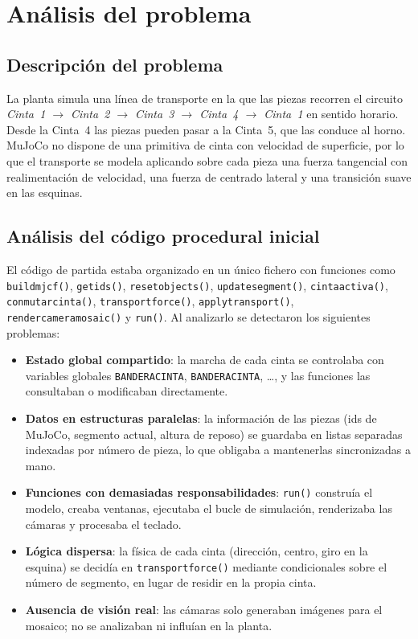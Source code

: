 \documentclass[12pt,a4paper]{article}
\renewcommand{\_}{\guionbajo\allowbreak}
\begin{document}
\clearpage
\section{Análisis del problema}

\subsection{Descripción del problema}

La planta simula una línea de transporte en la que las piezas recorren el circuito
\textit{Cinta~1 $\rightarrow$ Cinta~2 $\rightarrow$ Cinta~3 $\rightarrow$ Cinta~4
$\rightarrow$ Cinta~1} en sentido horario. Desde la Cinta~4 las piezas pueden pasar a la
Cinta~5, que las conduce al horno. MuJoCo no dispone de una primitiva de cinta con
velocidad de superficie, por lo que el transporte se modela aplicando sobre cada pieza una
fuerza tangencial con realimentación de velocidad, una fuerza de centrado lateral y una
transición suave en las esquinas.

\subsection{Análisis del código procedural inicial}

El código de partida estaba organizado en un único fichero con funciones como
\texttt{build\_mjcf()}, \texttt{get\_ids()}, \texttt{reset\_objects()},
\texttt{update\_segment()}, \texttt{cinta\_activa()}, \texttt{conmutar\_cinta()},
\texttt{transport\_force()}, \texttt{apply\_transport()},
\texttt{render\_camera\_mosaic()} y \texttt{run()}. Al analizarlo se detectaron los
siguientes problemas:

\begin{itemize}
    \item \textbf{Estado global compartido}: la marcha de cada cinta se controlaba con
          variables globales \texttt{BANDERA\_CINTA\_1}, \texttt{BANDERA\_CINTA\_2}, \dots, y
          las funciones las consultaban o modificaban directamente.
    \item \textbf{Datos en estructuras paralelas}: la información de las piezas (ids de
          MuJoCo, segmento actual, altura de reposo) se guardaba en listas separadas
          indexadas por número de pieza, lo que obligaba a mantenerlas sincronizadas a mano.
    \item \textbf{Funciones con demasiadas responsabilidades}: \texttt{run()} construía el
          modelo, creaba ventanas, ejecutaba el bucle de simulación, renderizaba las
          cámaras y procesaba el teclado.
    \item \textbf{Lógica dispersa}: la física de cada cinta (dirección, centro, giro en la
          esquina) se decidía en \texttt{transport\_force()} mediante condicionales sobre el
          número de segmento, en lugar de residir en la propia cinta.
    \item \textbf{Ausencia de visión real}: las cámaras solo generaban imágenes para el
          mosaico; no se analizaban ni influían en la planta.
\end{itemize}
\end{document}

